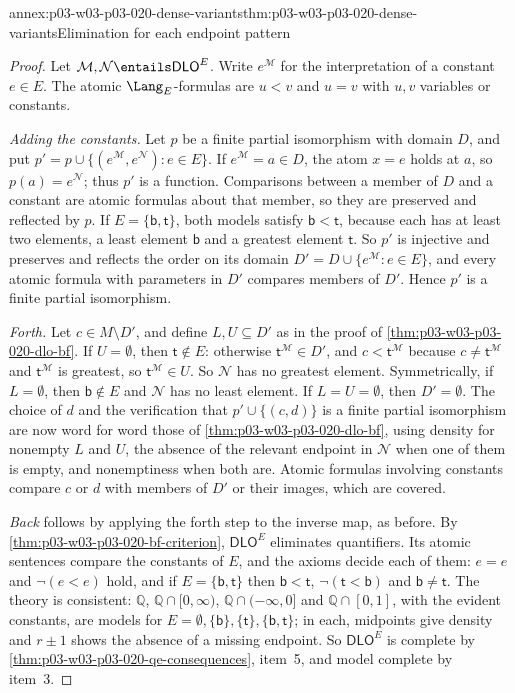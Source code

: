 \begin{annexitem}{annex:p03-w03-p03-020-dense-variants}{thm:p03-w03-p03-020-dense-variants}{Elimination for each endpoint pattern}
\begin{proof}
Let \(\mathcal M,\mathcal N\entails\mathsf{DLO}^{E}\). Write
\(e^{\mathcal M}\) for the interpretation of a constant \(e\in E\). The
atomic \(\Lang_E\)-formulas are \(u<v\) and \(u=v\) with \(u,v\) variables
or constants.

\emph{Adding the constants.} Let \(p\) be a finite partial isomorphism
with domain \(D\), and put
\(p'=p\cup\{(e^{\mathcal M},e^{\mathcal N}):e\in E\}\). If
\(e^{\mathcal M}=a\in D\), the atom \(x=e\) holds at \(a\), so
\(p(a)=e^{\mathcal N}\); thus \(p'\) is a function. Comparisons between a
member of \(D\) and a constant are atomic formulas about that member, so
they are preserved and reflected by \(p\). If \(E=\{\mathsf b,\mathsf t\}\),
both models satisfy \(\mathsf b<\mathsf t\), because each has at least two
elements, a least element \(\mathsf b\) and a greatest element
\(\mathsf t\). So \(p'\) is injective and preserves and reflects the order
on its domain \(D'=D\cup\{e^{\mathcal M}:e\in E\}\), and every atomic
formula with parameters in \(D'\) compares members of \(D'\). Hence \(p'\)
is a finite partial isomorphism.

\emph{Forth.} Let \(c\in M\setminus D'\), and define \(L,U\subseteq D'\) as
in the proof of \cref{thm:p03-w03-p03-020-dlo-bf}. If \(U=\emptyset\), then
\(\mathsf t\notin E\): otherwise \(\mathsf t^{\mathcal M}\in D'\), and
\(c<\mathsf t^{\mathcal M}\) because \(c\ne\mathsf t^{\mathcal M}\) and
\(\mathsf t^{\mathcal M}\) is greatest, so \(\mathsf t^{\mathcal M}\in U\).
So \(\mathcal N\) has no greatest element. Symmetrically, if
\(L=\emptyset\), then \(\mathsf b\notin E\) and \(\mathcal N\) has no least
element. If \(L=U=\emptyset\), then \(D'=\emptyset\). The choice of \(d\)
and the verification that \(p'\cup\{(c,d)\}\) is a finite partial
isomorphism are now word for word those of
\cref{thm:p03-w03-p03-020-dlo-bf}, using density for nonempty \(L\) and
\(U\), the absence of the relevant endpoint in \(\mathcal N\) when one of
them is empty, and nonemptiness when both are. Atomic formulas involving
constants compare \(c\) or \(d\) with members of \(D'\) or their images,
which are covered.

\emph{Back} follows by applying the forth step to the inverse map, as
before. By \cref{thm:p03-w03-p03-020-bf-criterion},
\(\mathsf{DLO}^{E}\) eliminates quantifiers. Its atomic sentences compare
the constants of \(E\), and the axioms decide each of them: \(e=e\) and
\(\neg(e<e)\) hold, and if \(E=\{\mathsf b,\mathsf t\}\) then
\(\mathsf b<\mathsf t\), \(\neg(\mathsf t<\mathsf b)\) and
\(\mathsf b\ne\mathsf t\). The theory is consistent: \(\mathbb Q\),
\(\mathbb Q\cap[0,\infty)\), \(\mathbb Q\cap(-\infty,0]\) and
\(\mathbb Q\cap[0,1]\), with the evident constants, are models for
\(E=\emptyset,\{\mathsf b\},\{\mathsf t\},\{\mathsf b,\mathsf t\}\); in each,
midpoints give density and \(r\pm1\) shows the absence of a missing
endpoint. So \(\mathsf{DLO}^{E}\) is complete by
\cref{thm:p03-w03-p03-020-qe-consequences}, item~5, and model complete by
item~3.


\end{proof}
\end{annexitem}
